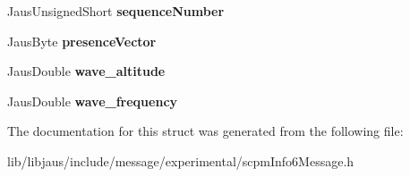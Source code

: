 \begin{DoxyCompactItemize}
\item 
\hypertarget{struct_s_c_p_m_info6_message_struct_a6fdb2231add9cc7cc90dd30ccdd241a7}{\-Jaus\-Unsigned\-Short {\bfseries sequence\-Number}}\label{struct_s_c_p_m_info6_message_struct_a6fdb2231add9cc7cc90dd30ccdd241a7}

\item 
\hypertarget{struct_s_c_p_m_info6_message_struct_a9cd3cfed11128da54a813718aed12910}{\-Jaus\-Byte {\bfseries presence\-Vector}}\label{struct_s_c_p_m_info6_message_struct_a9cd3cfed11128da54a813718aed12910}

\item 
\hypertarget{struct_s_c_p_m_info6_message_struct_a1c2259c2bd17f6f2c06766b29b887f2d}{\-Jaus\-Double {\bfseries wave\-\_\-altitude}}\label{struct_s_c_p_m_info6_message_struct_a1c2259c2bd17f6f2c06766b29b887f2d}

\item 
\hypertarget{struct_s_c_p_m_info6_message_struct_adb536303e686b845cfc725a557bff617}{\-Jaus\-Double {\bfseries wave\-\_\-frequency}}\label{struct_s_c_p_m_info6_message_struct_adb536303e686b845cfc725a557bff617}

\end{DoxyCompactItemize}


\-The documentation for this struct was generated from the following file\-:\begin{DoxyCompactItemize}
\item 
lib/libjaus/include/message/experimental/scpm\-Info6\-Message.\-h\end{DoxyCompactItemize}
